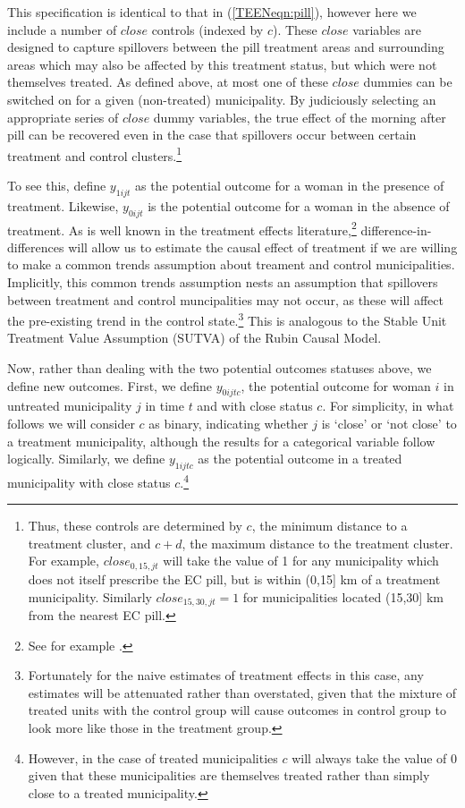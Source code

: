 This specification is identical to that in (\ref{TEENeqn:pill}), however here we 
include a number of $close$ controls (indexed by $c$).  These $close$ variables are 
designed to capture spillovers between the pill treatment areas and surrounding 
areas which may also be affected by this treatment status, but which were not 
themselves treated.  As defined above, at most one of these $close$ dummies can
be switched on for a given (non-treated) municipality.  By judiciously selecting 
an appropriate series of $close$ dummy variables, the true effect of the morning 
after pill can be recovered even in the case that spillovers occur between 
certain treatment and control clusters.\footnote{Thus, these controls are 
determined by $c$, the minimum distance to a treatment cluster, and $c+d$, 
the maximum distance to the treatment cluster. For example, $close_{0,15,jt}$ 
will take the value of 1 for any municipality which does not itself prescribe 
the EC pill, but is within (0,15] km of a treatment municipality.  Similarly 
$close_{15,30,jt}=1$ for municipalities located (15,30] km from the nearest
EC pill.}

To see this, define $y_{1ijt}$ as the potential outcome for a woman in the 
presence of treatment.  Likewise, $y_{0ijt}$ is the potential outcome for a 
woman in the absence of treatment.  As is well known in the treatment effects
literature,\footnote{See for example \citet{CardKruger1994}.} difference-in-%
differences will allow us to estimate the causal effect of treatment if we are 
willing to make a common trends assumption about treament and control 
municipalities.  Implicitly, this common trends assumption nests an assumption
that spillovers between treatment and control muncipalities may not occur, as 
these will affect the pre-existing trend in the control state.\footnote{%
Fortunately for the naive estimates of treatment effects in this case, any 
estimates will be attenuated rather than overstated, given that the mixture of 
treated units with the control group will cause outcomes in control group to 
look more like those in the treatment group.}  This is analogous to the Stable 
Unit Treatment Value Assumption (SUTVA) of the Rubin Causal Model.

Now, rather than dealing with the two potential outcomes statuses above, we
define new outcomes.  First, we define $y_{0ijtc}$, the potential outcome for 
woman $i$ in untreated municipality $j$ in time $t$ and with close status $c$.  
For simplicity, in what follows we will consider $c$ as binary, indicating whether
$j$ is `close' or `not close' to a treatment municipality, although the results
for a categorical variable follow logically.  Similarly, we define $y_{1ijtc}$
as the potential outcome in a treated municipality with close status 
$c$.\footnote{However, in the case of treated municipalities $c$ will always
take the value of 0 given that these municipalities are themselves treated rather
than simply close to a treated municipality.}

